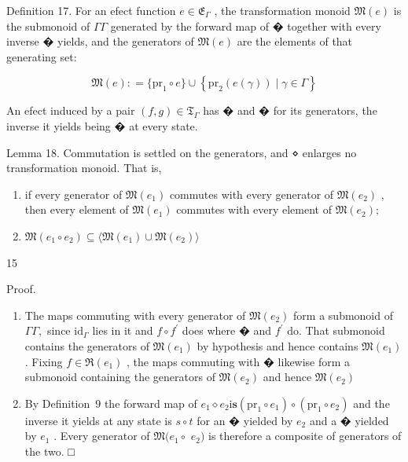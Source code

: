 \documentclass[
  10
]{article}
\begin{document}
Definition 17. For an efect function
\(e \in { \mathfrak { E } } _ { \Gamma }\) , the transformation monoid
\({ \mathfrak { M } } ( e )\) is the submonoid of \(\Gamma  \Gamma\)
generated by the forward map of � together with every inverse � yields,
and the generators of \({ \mathfrak { M } } ( e )\) are the elements of
that generating set:

\[
\mathfrak { M } ( e ) : = \left. \{ \mathrm { p r } _ { 1 } \circ e \} \cup \left\{ \mathrm { p r } _ { 2 } ( e ( \gamma ) ) \mid \gamma \in \Gamma \right\} \right.\tag{17}
\]

An efect induced by a pair
\(( f , g ) \in \mathfrak { T } _ { \Gamma }\) has � and � for its
generators, the inverse it yields being � at every state.

Lemma 18. Commutation is settled on the generators, and ⋄ enlarges no
transformation monoid. That is,

\begin{enumerate}
\def\labelenumi{\arabic{enumi}.}
\item
  if every generator of \(\mathfrak { M } ( e _ { 1 } )\) commutes with
  every generator of \(\mathfrak { M } ( e _ { 2 } )\) , then every
  element of \(\mathfrak { M } ( e _ { 1 } )\) commutes with every
  element of \({ \mathfrak { M } } ( e _ { 2 } ) ;\)
\item
  \(\mathfrak { M } ( e _ { 1 } \circ e _ { 2 } ) \subseteq \langle \mathfrak { M } ( e _ { 1 } ) \cup \mathfrak { M } ( e _ { 2 } ) \rangle\)
\end{enumerate}

15

Proof.

\begin{enumerate}
\def\labelenumi{\arabic{enumi}.}
\item
  The maps commuting with every generator of
  \(\mathfrak { M } ( e _ { 2 } )\) form a submonoid of
  \(\Gamma  \Gamma ,\) since \(\mathrm { i d } _ { \Gamma }\) lies in it
  and \(f \circ f ^ { \prime }\) does where � and \(f ^ { \prime }\) do.
  That submonoid contains the generators of
  \(\mathfrak { M } ( e _ { 1 } )\) by hypothesis and hence contains
  \(\mathfrak { M } ( e _ { 1 } )\) . Fixing \(f \in \Re ( e _ { 1 } )\)
  , the maps commuting with � likewise form a submonoid containing the
  generators of \(\mathfrak { M } ( e _ { 2 } )\) and hence
  \(\mathfrak { M } ( e _ { 2 } )\)
\item
  By Definition~9 the forward map of
  \(e _ { 1 } \diamond e _ { 2 } \mathrm { i } \mathbf { s } \left( \mathrm { p r } _ { 1 } \circ e _ { 1 } \right) \circ \left( \mathrm { p r } _ { 1 } \circ e _ { 2 } \right)\)
  and the inverse it yields at any state is \(s \circ t\) for an �
  yielded by \(e _ { 2 }\) and a � yielded by \(e _ { 1 }\) . Every
  generator of \({ \mathfrak { M } } ( e _ { 1 } \circ\) \(e _ { 2 } )\)
  is therefore a composite of generators of the two. □
\end{enumerate}
\end{document}
